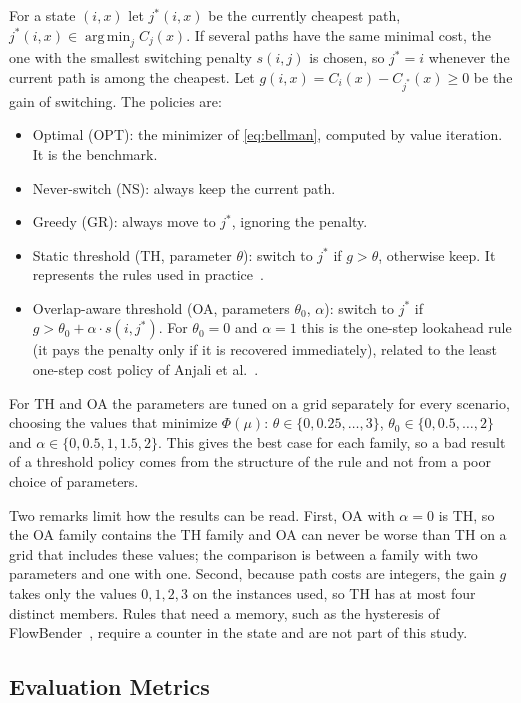 \documentclass{amsart}
\DeclareMathOperator*{\argmin}{arg\,min}
\begin{document}
For a state $(i,x)$ let $j^*(i,x)$ be the currently cheapest path, $j^*(i,x) \in \argmin_j C_j(x)$. If several paths have the same minimal cost, the one with the smallest switching penalty $s(i,j)$ is chosen, so $j^* = i$ whenever the current path is among the cheapest. Let $g(i,x) = C_i(x) - C_{j^*}(x) \ge 0$ be the gain of switching. The policies are:
\begin{itemize}
  \item Optimal (OPT): the minimizer of \eqref{eq:bellman}, computed by value iteration. It is the benchmark.
  \item Never-switch (NS): always keep the current path.
  \item Greedy (GR): always move to $j^*$, ignoring the penalty.
  \item Static threshold (TH, parameter $\theta$): switch to $j^*$ if $g > \theta$, otherwise keep. It represents the rules used in practice~\cite{kikuchi2025,kabbani2014}.
  \item Overlap-aware threshold (OA, parameters $\theta_0$, $\alpha$): switch to $j^*$ if $g > \theta_0 + \alpha \cdot s(i,j^*)$. For $\theta_0 = 0$ and $\alpha = 1$ this is the one-step lookahead rule (it pays the penalty only if it is recovered immediately), related to the least one-step cost policy of Anjali et al.~\cite{anjali2002}.
\end{itemize}
For TH and OA the parameters are tuned on a grid separately for every scenario, choosing the values that minimize $\Phi(\mu)$: $\theta \in \{0, 0.25, \dots, 3\}$, $\theta_0 \in \{0, 0.5, \dots, 2\}$ and $\alpha \in \{0, 0.5, 1, 1.5, 2\}$. This gives the best case for each family, so a bad result of a threshold policy comes from the structure of the rule and not from a poor choice of parameters.

Two remarks limit how the results can be read. First, OA with $\alpha = 0$ is TH, so the OA family contains the TH family and OA can never be worse than TH on a grid that includes these values; the comparison is between a family with two parameters and one with one. Second, because path costs are integers, the gain $g$ takes only the values $0, 1, 2, 3$ on the instances used, so TH has at most four distinct members. Rules that need a memory, such as the hysteresis of FlowBender~\cite{kabbani2014}, require a counter in the state and are not part of this study.

\subsection{Evaluation Metrics}
\end{document}
